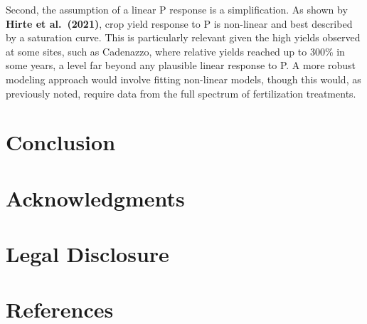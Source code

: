 \documentclass[
  a4paper,
]{article}
\begin{document}
Second, the assumption of a linear P response is a simplification. As
shown by \textbf{Hirte et al.~(2021)}, crop yield response to P is
non-linear and best described by a saturation curve. This is
particularly relevant given the high yields observed at some sites, such
as Cadenazzo, where relative yields reached up to 300\% in some years, a
level far beyond any plausible linear response to P. A more robust
modeling approach would involve fitting non-linear models, though this
would, as previously noted, require data from the full spectrum of
fertilization treatments.

\section{Conclusion}\label{conclusion}

\section{Acknowledgments}\label{acknowledgments}

\section{Legal Disclosure}\label{legal-disclosure}

\newpage

\section{References}\label{references}
\end{document}
